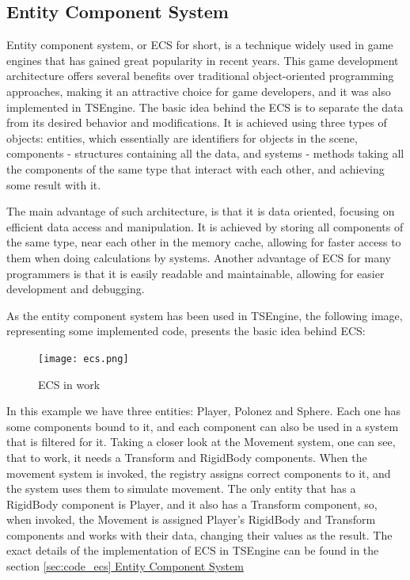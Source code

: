 \subsection{Entity Component System}
\label{sec:theory_ecs}
\hspace{\parindent}
Entity component system, or ECS for short, is a technique widely used in game engines that has gained great popularity in recent years. This game development architecture offers several benefits over traditional object-oriented programming approaches, making it an attractive choice for game developers, and it was also implemented in TSEngine. The basic idea behind the ECS is to separate the data from its desired behavior and modifications. It is achieved using three types of objects: entities, which essentially are identifiers for objects in the scene, components - structures containing all the data, and systems - methods taking all the components of the same type that interact with each other, and achieving some result with it. 

The main advantage of such architecture, is that it is data oriented, focusing on efficient data access and manipulation. It is achieved by storing all components of the same type, near each other in the memory cache, allowing for faster access to them when doing calculations by systems. Another advantage of ECS for many programmers is that it is easily readable and maintainable, allowing for easier development and debugging.

As the entity component system has been used in TSEngine, the following image, representing some implemented code, presents the basic idea behind ECS:
\begin{figure}[H]
  \begin{center}
    \texttt{[image: ecs.png]}
  \end{center}
  \caption{ECS in work}
\end{figure}
In this example we have three entities: Player, Polonez and Sphere. Each one has some components bound to it, and each component can also be used in a system that is filtered for it. Taking a closer look at the Movement system, one can see, that to work, it needs a Transform and RigidBody components. When the movement system is invoked, the registry assigns correct components to it, and the system uses them to simulate movement. The only entity that has a RigidBody component is Player, and it also has a Transform component, so, when invoked, the Movement is assigned Player's RigidBody and Transform components and works with their data, changing their values as the result. The exact details of the implementation of ECS in TSEngine can be found in the section \hyperref[sec:code_ecs]{\ref*{sec:code_ecs} Entity Component System}

